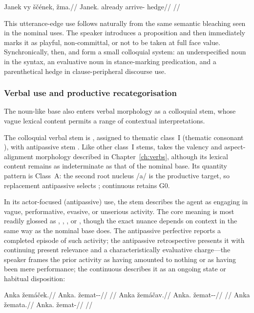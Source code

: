 \pex
\begingl
\gla Janek vy ščének, žma.//
\glb Janek.\Dir{} already arrive-\Pf{} hedge//
\glft {}//
\endgl
\xe

This utterance-edge use follows naturally from the same semantic bleaching seen
in the nominal uses. The speaker introduces a proposition and then immediately
marks it as playful, non-committal, or not to be taken at full face value.
Synchronically, then,  and  form a small colloquial system:
an underspecified noun in the syntax, an evaluative noun in stance-marking
predication, and a parenthetical hedge in clause-peripheral discourse use.

\subsubsection{Verbal use and productive
recategorisation}\label{sec:spoken-zema-verbal}

The noun-like base also enters verbal morphology as a colloquial stem,
whose vague lexical content permits a range of contextual interpretations.

The colloquial verbal stem is , assigned to thematic class~I
(thematic consonant ), with antipassive stem . Like
other class~I stems,  takes the valency and
aspect-alignment morphology described in Chapter~\ref{ch:verbs}, although its
lexical content remains as indeterminate as that of the nominal base.
Its quantity pattern is Class~A: the second root nucleus /a/ is the
productive target, so replacement antipassive selects ;
continuous  retains G0.

In its actor-focused (antipassive) use, the stem describes the agent as engaging
in vague, performative, evasive, or unserious activity. The core meaning is most
readily glossed as , , , or , though the exact
nuance depends on context in the same way as the nominal base does. The
antipassive perfective  reports a completed episode of such
activity; the antipassive retrospective  presents it with
continuing present relevance and a characteristically evaluative charge---the
speaker frames the prior activity as having amounted to nothing or as having
been mere performance; the continuous  describes it as an ongoing
state or habitual disposition:

\pex
\a
\begingl
\gla Anka žemáček.//
\glb Anka.\Dir{} žemat-\Antip{}-\Pf{}//
\glft {}//
\endgl
\a
\begingl
\gla Anka žemáčav.//
\glb Anka.\Dir{} žemat-\Antip{}-\Ret{}//
\glft {}//
\endgl
\a
\begingl
\gla Anka žemata.//
\glb Anka.\Dir{} žemat-\Cont{}//
\glft {}//
\endgl
\xe

